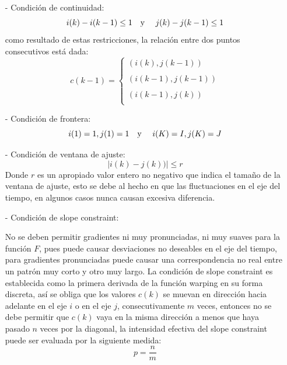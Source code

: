 \begin{enumerate}
\begin{enumerate}
\begin{enumerate}
\item[-]Condición de continuidad:
\begin{equation}
\label{eq:ecuacion81}
i(k) - i(k - 1) \leq 1
\text{\quad y \quad}
j(k) - j(k - 1) \leq 1
\end{equation}
como resultado de estas restricciones, la relación entre dos puntos consecutivos está dada:
\begin{equation}
\label{eq:ecuacion82}
c(k - 1) = \left\{ \begin{array}{lcl}
(i(k),j(k - 1)) \\
\\
(i(k - 1),j(k - 1)) \\
\\
(i(k - 1), j(k)) \\
\end{array}
\right.
\end{equation}

\item[-]Condición de frontera:
\begin{equation}
\label{eq:ecuacion83}
i(1) = 1, j(1) = 1
\text{\quad y \quad}
i(K) = I, j(K) = J
\end{equation}

\item[-]Condición de ventana de ajuste:
\begin{equation}
\label{eq:ecuacion84}
\left | i(k) - j(k)) \right | \leq  r
\end{equation}
Donde $r$ es un apropiado valor entero no negativo que indica el tamaño de la ventana de ajuste, esto se debe al hecho en que las fluctuaciones en el eje del tiempo, en algunos casos nunca causan excesiva diferencia.

\item[-]Condición de slope constraint:
\par
No se deben permitir gradientes ni muy pronunciadas, ni muy suaves para la función $F$, pues puede causar desviaciones no deseables en el eje del tiempo, para gradientes pronunciadas puede causar una correspondencia no real entre un patrón muy corto y otro muy largo.
\vskip 0.5cm
La condición de slope constraint es establecida como la primera derivada de la función warping en su forma discreta, así se obliga que los valores $c(k)$ se muevan en dirección hacia adelante en el eje $i$ o en el eje $j$, consecutivamente $m$ veces, entonces no se debe permitir que $c(k)$ vaya en la misma dirección a menos que haya pasado $n$ veces por la diagonal, la intensidad efectiva del slope constraint puede ser evaluada por la siguiente medida:
\begin{equation}
\label{eq:ecuacion85}
p = \frac{n}{m}
\end{equation}


\end{enumerate}
\end{enumerate}
\end{enumerate}
